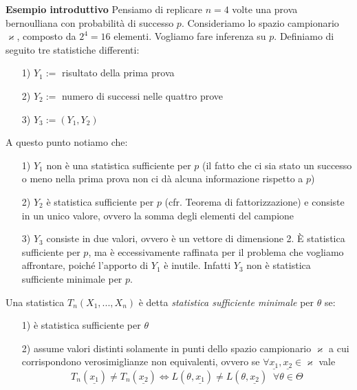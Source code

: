 \textbf{Esempio introduttivo} Pensiamo di replicare $n=4$ volte una prova bernoulliana con probabilità di successo $p$. Consideriamo lo spazio campionario $\varkappa$, composto da $2^4=16$ elementi. Vogliamo fare inferenza su $p$. Definiamo di seguito tre statistiche differenti:

\begin{enumerate}
\item [1)] $Y_1 := $ risultato della prima prova
\item [2)] $Y_2 := $ numero di successi nelle quattro prove
\item [3)] $Y_3 := (Y_1,Y_2)$
\end{enumerate}

A questo punto notiamo che:

\begin{enumerate}
\item [1)] $Y_1$ non è una statistica sufficiente per $p$ (il fatto che ci sia stato un successo o meno nella prima prova non ci dà alcuna informazione rispetto a $p$)
\item [2)] $Y_2$ è statistica sufficiente per $p$ (cfr. Teorema di fattorizzazione) e consiste in un unico valore, ovvero la somma degli elementi del campione
\item [3)] $Y_3$ consiste in due valori, ovvero è un vettore di dimensione 2. È statistica sufficiente per $p$, ma è eccessivamente raffinata per il problema che vogliamo affrontare, poiché l'apporto di $Y_1$ è inutile. Infatti $Y_3$ non è statistica sufficiente minimale per $p$.
\end{enumerate}

\begin{definizione}
Una statistica $T_n(X_1,...,X_n)$ è detta \textit{statistica sufficiente minimale} per $\theta$ se:
\begin{enumerate}
\item [1)] è statistica sufficiente per $\theta$
\item [2)] assume valori distinti solamente in punti dello spazio campionario $\varkappa$ a cui corrispondono verosimiglianze non equivalenti, ovvero se $\forall \underline{x_1}, \underline{x_2} \in \varkappa$ vale 
$$T_n(\underline{x_1}) \neq T_n(\underline{x_2}) \Longleftrightarrow L(\theta, \underline{x_1}) \neq L(\theta, \underline{x_2}) \; \; \forall \theta \in \Theta$$
\end{enumerate}
\end{definizione}

